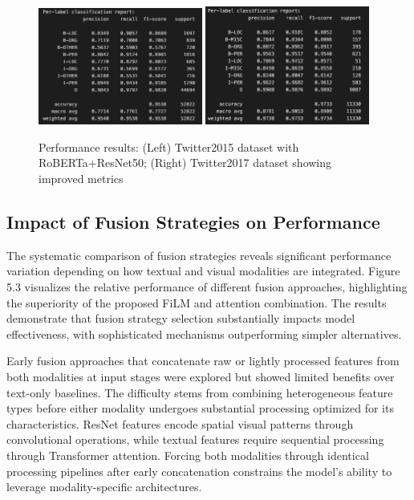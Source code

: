 \documentclass[12pt,a4paper]{report}
\begin{document}
\begin{figure}[H]
\centering
\includegraphics[width=0.48\textwidth]{roberta_resnet50_2015.png}
\hfill
\includegraphics[width=0.48\textwidth]{resnet50+roberta2017.png}
\caption{Performance results: (Left) Twitter2015 dataset with RoBERTa+ResNet50; (Right) Twitter2017 dataset showing improved metrics}
\label{fig:results_both}
\end{figure}

\subsection{Impact of Fusion Strategies on Performance}

The systematic comparison of fusion strategies reveals significant performance variation depending on how textual and visual modalities are integrated. Figure 5.3 visualizes the relative performance of different fusion approaches, highlighting the superiority of the proposed FiLM and attention combination. The results demonstrate that fusion strategy selection substantially impacts model effectiveness, with sophisticated mechanisms outperforming simpler alternatives.

Early fusion approaches that concatenate raw or lightly processed features from both modalities at input stages were explored but showed limited benefits over text-only baselines. The difficulty stems from combining heterogeneous feature types before either modality undergoes substantial processing optimized for its characteristics. ResNet features encode spatial visual patterns through convolutional operations, while textual features require sequential processing through Transformer attention. Forcing both modalities through identical processing pipelines after early concatenation constrains the model's ability to leverage modality-specific architectures.
\end{document}

